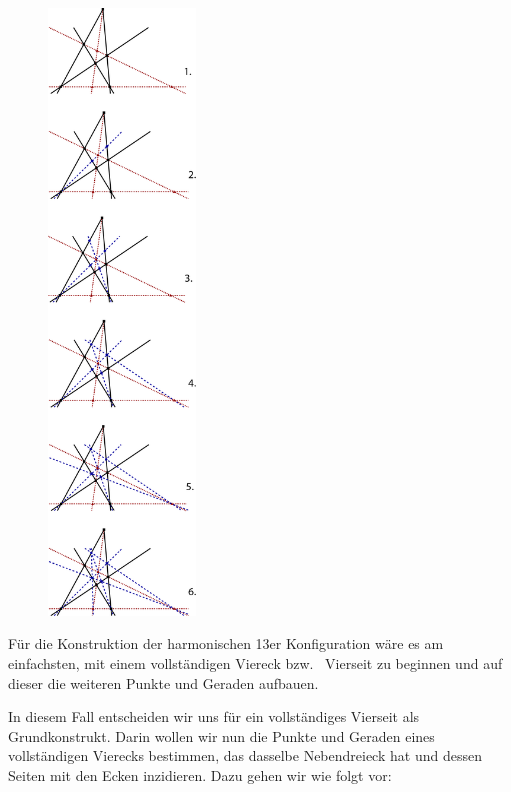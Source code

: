 \documentclass[12pt,a4paper]{article}
\begin{document}
\begin{figure}
\centering
\includegraphics[width=0.35\textwidth]{Bilder/13erKonfigStepbyStep3.png}
\end{figure}

Für die Konstruktion der harmonischen 13er Konfiguration wäre es am einfachsten, mit einem vollständigen Viereck bzw.~ Vierseit zu beginnen und auf dieser die weiteren Punkte und Geraden aufbauen.

In diesem Fall entscheiden wir uns für ein vollständiges Vierseit als Grundkonstrukt. Darin wollen wir nun die Punkte und Geraden eines vollständigen Vierecks bestimmen, das dasselbe Nebendreieck hat und dessen Seiten mit den Ecken inzidieren. Dazu gehen wir wie folgt vor:
\end{document}
